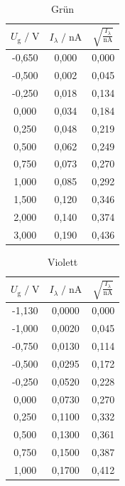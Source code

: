 \begin{table}
    \centering
    \caption{Grün}
    \label{tab:gruen}
    \begin{tabular}{c c c}
    \toprule
    $ U_\text{g} \;/\; \si{\volt} $ & $I_\lambda \;/\; \si{\nano\ampere}$ &
    $ \sqrt{\frac{I_\lambda}{\si{\nano\ampere}}}$\\
    \midrule 
       -0,650 & 0,000 & 0,000\\   
       -0,500 & 0,002 & 0,045\\  
       -0,250 & 0,018 & 0,134\\  
        0,000 & 0,034 & 0,184\\ 
        0,250 & 0,048 & 0,219\\  
        0,500 & 0,062 & 0,249\\
        0,750 & 0,073 & 0,270\\  
        1,000 & 0,085 & 0,292\\  
        1,500 & 0,120 & 0,346\\ 
        2,000 & 0,140 & 0,374\\ 
        3,000 & 0,190 & 0,436\\       
    \bottomrule
    \end{tabular}
\end{table}

\begin{table}
    \centering
    \caption{Violett}
    \label{tab:viol}
    \begin{tabular}{c c c}
    \toprule
    $ U_\text{g} \;/\; \si{\volt} $ & $I_\lambda \;/\; \si{\nano\ampere}$ &
    $ \sqrt{\frac{I_\lambda}{\si{\nano\ampere}}}$\\
    \midrule 
      -1,130 & 0,0000 & 0,000\\
      -1,000 & 0,0020 & 0,045\\
      -0,750 & 0,0130 & 0,114\\
      -0,500 & 0,0295 & 0,172\\
      -0,250 & 0,0520 & 0,228\\
       0,000 & 0,0730 & 0,270\\
       0,250 & 0,1100 & 0,332\\
       0,500 & 0,1300 & 0,361\\
       0,750 & 0,1500 & 0,387\\
       1,000 & 0,1700 & 0,412\\     
    \bottomrule
    \end{tabular}
\end{table}

